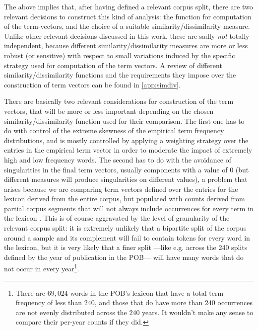 The above implies that, after having defined a relevant corpus split, there are two relevant decisions to construct this kind of analysis: the function for computation of the term-vectors, and the choice of a suitable similarity/dissimilarity measure.
Unlike other relevant decisions discussed in this work, these are sadly \emph{not} totally independent, because different similarity/dissimilarity measures are more or less robust (or sensitive) with respect to small variations induced by the specific strategy used for computation of the term vectors.
A review of different similarity/dissimilarity functions and the requirements they impose over the construction of term vectors can be found in \autoref{app:simdiv}.

There are basically two relevant considerations for construction of the term vectors, that will be more or less important depending on the chosen similarity/dissimilarity function used for their comparison.
The first one has to do with control of the extreme skewness of the empirical term frequency distributions, and is mostly controlled by applying a weighting strategy over the entries in the empirical term vector in order to moderate the impact of extremely high and low frequency words.
The second has to do with the avoidance of singularities in the final term vectors, usually components with a value of $0$ (but different measures will produce singularities on different values), a problem that arises because we are comparing term vectors defined over the entries for the lexicon derived from the entire corpus, but populated with counts derived from partial corpus segments that will not always include occurrences for every term in the lexicon
.
This is of course aggravated by the level of granularity of the relevant corpus split: it is extremely unlikely that a bipartite split of the corpus around a sample and its complement will fail to contain tokens for every word in the lexicon, but it is very likely that a finer split ---like e.g. across the 240 splits defined by the year of publication in the POB--- will have many words that do not occur in every year\footnote{
    \label{foot:lt240}
    There are $69,024$ words in the POB's lexicon that have a total term frequency of less than $240$, and those that do have more than $240$ occurrences are not evenly distributed across the 240 years.
    It wouldn't make any sense to compare their per-year counts if they did.
}.

